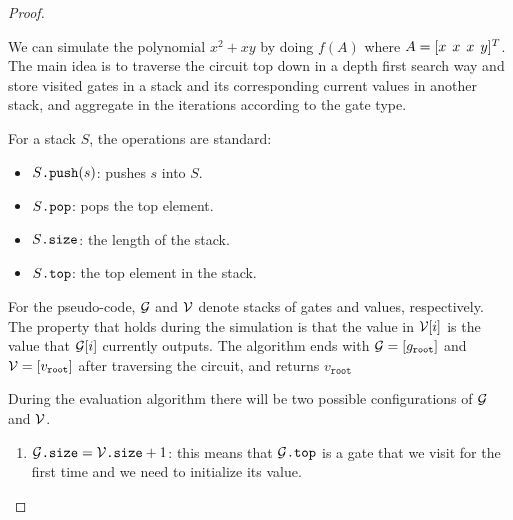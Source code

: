 \begin{proof}
    \begin{center}
    \end{center}

    We can simulate the polynomial $x^2+xy$ by doing $f(A)$ where $A=[x \hspace{1ex} x \hspace{1ex} x \hspace{1ex} y]^T$. The main idea is to traverse the circuit top down in a depth first search way and store visited gates in a stack and its corresponding current values in another stack, and aggregate in the iterations according to the gate type.

    For a stack $S$, the operations are standard:

    \begin{itemize}
        \item $S\texttt{.push}(s)$: pushes $s$ into $S$.
        \item $S\texttt{.pop}$: pops the top element.
        \item $S\texttt{.size}$: the length of the stack.
        \item $S\texttt{.top}$: the top element in the stack.
    \end{itemize}

    For the pseudo-code, $\mathcal{G}$ and $\mathcal{V}$ denote stacks of gates and values, respectively. The property that holds during the simulation is that the value in $\mathcal{V}[i]$ is the value that $\mathcal{G}[i]$ currently outputs. The algorithm ends with $\mathcal{G}=\left[ g_{\texttt{root}}\right]$ and $\mathcal{V}=\left[ v_{\texttt{root}}\right]$ after traversing the circuit, and returns $v_{\texttt{root}}$

    During the evaluation algorithm there will be two possible configurations of $\mathcal{G}$ and $\mathcal{V}$.

    \begin{enumerate}
        \item $\mathcal{G}\texttt{.size} = \mathcal{V}\texttt{.size} + 1$: this means that $\mathcal{G}\texttt{.top}$ is a gate that we visit for the first time and we need to initialize its value.
        

\end{enumerate}
\end{proof}
